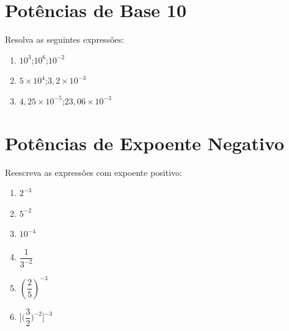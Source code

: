 \documentclass[a4paper,12pt]{article}
\begin{document}
\begin{multicols}{2}
		\section*{Potências de Base 10} \vspace{-5mm}
		Resolva as seguintes expressões: \vspace{-4mm}
		\begin{enumerate}[label=\roman*.]
			\item $10^3$;\quad $10^6$;\quad $10^{-2}$
			\item $5 \times 10^4$;\quad $3,2 \times 10^{-3}$
			\item $4,25 \times 10^{-5}$;\quad $23,06 \times 10^{-3}$
		\end{enumerate}
		
		\section*{Potências de Expoente Negativo}\vspace{-5mm}
		Reescreva as expressões com expoente positivo:\vspace{-4mm}
		\begin{multicols}{2}
		\begin{enumerate}[label=\roman*.]
			\item $2^{-3}$
			\item $5^{-2}$
			\item $10^{-4}$
			\item $\dfrac{1}{3^{-2}}$
			\item $\left(\dfrac{2}{5}\right)^{-3}$
			\item $ \Bigg[ \bigg( \dfrac{3}{2} \bigg)^{-2} \Bigg] ^{-3}$
		\end{enumerate}
		\end{multicols}
		

\end{multicols}
\end{document}
